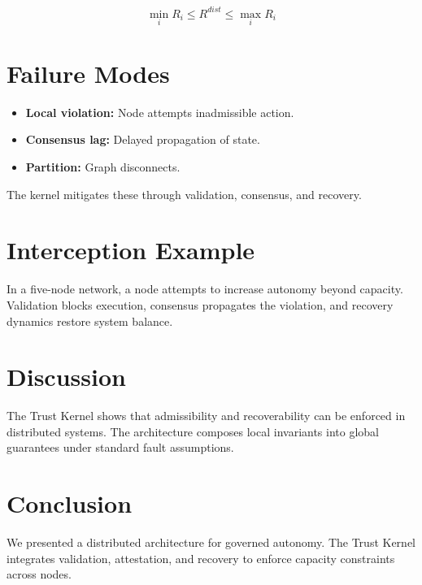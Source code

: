 \documentclass[letterpaper, 10 pt, conference]{ieeeconf}
\begin{document}
\begin{proposition}
\begin{equation}
\min_i R_i \le R^{dist} \le \max_i R_i
\end{equation}
\end{proposition}

\section{Failure Modes}

\begin{itemize}
\item \textbf{Local violation:} Node attempts inadmissible action.
\item \textbf{Consensus lag:} Delayed propagation of state.
\item \textbf{Partition:} Graph disconnects.
\end{itemize}

The kernel mitigates these through validation, consensus, and recovery.

\section{Interception Example}

In a five-node network, a node attempts to increase autonomy beyond capacity. Validation blocks execution, consensus propagates the violation, and recovery dynamics restore system balance.

\section{Discussion}

The Trust Kernel shows that admissibility and recoverability can be enforced in distributed systems. The architecture composes local invariants into global guarantees under standard fault assumptions.

\section{Conclusion}

We presented a distributed architecture for governed autonomy. The Trust Kernel integrates validation, attestation, and recovery to enforce capacity constraints across nodes.
\end{document}
